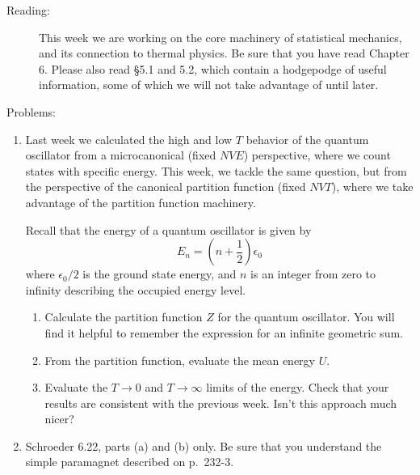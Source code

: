 \documentclass[12pt]{article}
\begin{document}
\begin{description}

\item[Reading:] This week we are working on the core machinery of
  statistical mechanics, and its connection to thermal physics. Be sure
  that you have read Chapter 6.  Please also read \S 5.1 and 5.2, which
  contain a hodgepodge of useful information, some of which we will not
  take advantage of until later. 

\item[Problems:] 
\end{description}

\begin{enumerate}

 

\item Last week we calculated the high and low $T$ behavior of the
  quantum oscillator from a microcanonical (fixed $NVE$) perspective,
  where we count states with specific energy.  This week, we
  tackle the same question, but from the perspective of the canonical
  partition function (fixed $NVT$), where we take advantage of the
  partition function machinery.

Recall that the energy of a quantum oscillator is given by
$$E_n = \left(n+\frac{1}{2}\right) \epsilon_0 $$
where $\epsilon_0/2$ is the ground state energy, and $n$ is an integer
from zero to infinity describing the occupied energy level.
\begin{enumerate}
\item Calculate the partition function $Z$ for the quantum oscillator.
  You will find it helpful to remember the expression for an infinite
  geometric sum.
\item From the partition function, evaluate the mean energy $U$.
\item Evaluate the $T\rightarrow 0$ and $T\rightarrow \infty$ limits
  of the energy.  Check that your results are consistent with the
  previous week.  Isn't this approach much nicer?
\end{enumerate}

\item Schroeder 6.22, parts (a) and (b) only.  Be sure that you understand
  the simple paramagnet described on p.\ 232-3.




\end{enumerate}
\end{document}
